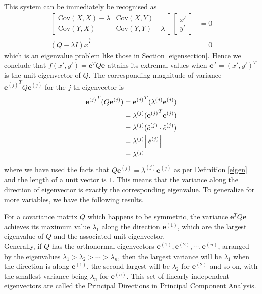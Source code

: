This system can be immediately be recognised as
\begin{align*}
\begin{bmatrix}
\text{Cov}(X, X)-\lambda & \text{Cov}(X, Y) \\
\text{Cov}(Y, X) & \text{Cov}(Y, Y)-\lambda
\end{bmatrix}
\begin{bmatrix}
x' \\
y'
\end{bmatrix} &= 0\\
(Q-\lambda I)\vec{x'} &= 0
\end{align*}
which is an eigenvalue problem like those in Section \ref{eigensection}. Hence we conclude that $f(x',y') = \textbf{e}^T Q \textbf{e}$ attains its extremal values when $\textbf{e}^T = (x',y')^T$ is the unit eigenvector of $Q$. The corresponding magnitude of variance ${\textbf{e}^{(j)}}^T Q \textbf{e}^{(j)}$ for the $j$-th eigenvector is
\begin{align*}
{\textbf{e}^{(j)}}^T (Q \textbf{e}^{(j)}) &= {\textbf{e}^{(j)}}^T (\lambda^{(j)} \textbf{e}^{(j)}) \\
&= \lambda^{(j)} ({\textbf{e}^{(j)}}^T \textbf{e}^{(j)}) \\
&= \lambda^{(j)} (\hat{e}^{(j)} \cdot \hat{e}^{(j)}) \\
&= \lambda^{(j)} \norm{\hat{e}^{(j)}} \\
&= \lambda^{(j)}
\end{align*}
where we have used the facts that $Q \textbf{e}^{(j)} = \lambda^{(j)} \textbf{e}^{(j)}$ as per Definition \ref{eigen} and the length of a unit vector is $1$. This means that the variance along the direction of eigenvector is exactly the corresponding eigenvalue. To generalize for more variables, we have the following results.
\begin{thm}
For a covariance matrix $Q$ which happens to be symmetric, the variance $\textbf{e}^T Q \textbf{e}$ achieves its maximum value $\lambda_1$ along the direction $\textbf{e}^{(1)}$, which are the largest eigenvalue of $Q$ and the associated unit eigenvector. \\
Generally, if $Q$ has the orthonormal eigenvectors $\textbf{e}^{(1)}, \textbf{e}^{(2)}, \cdots, \textbf{e}^{(n)}$, arranged by the eigenvalues $\lambda_1 > \lambda_2 > \cdots > \lambda_n$, then the largest variance will be $\lambda_1$ when the direction is along $\textbf{e}^{(1)}$, the second largest will be  $\lambda_2$ for $\textbf{e}^{(2)}$ and so on, with the smallest variance being $\lambda_n$ for $\textbf{e}^{(n)}$. This set of linearly independent eigenvectors are called the Principal Directions in Principal Component Analysis.
\end{thm}
